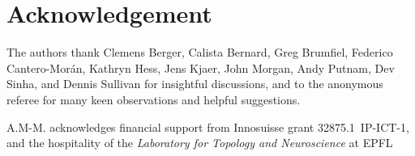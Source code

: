 \section*{Acknowledgement}

The authors thank Clemens Berger, Calista Bernard, Greg Brumfiel, Federico Cantero-Mor\'an, Kathryn Hess, Jens Kjaer, John Morgan, Andy Putnam, Dev Sinha, and Dennis Sullivan for insightful discussions, and to the anonymous referee for many keen observations and helpful suggestions.

A.M-M. acknowledges financial support from Innosuisse grant \mbox{32875.1 IP-ICT-1}, and the hospitality of the \textit{Laboratory for Topology and Neuroscience} at EPFL